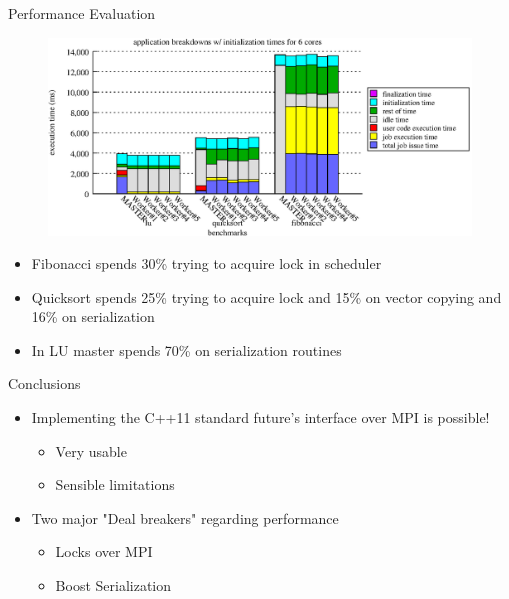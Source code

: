 \documentclass[svgnames]{beamer}
\begin{document}
\begin{frame}{Performance Evaluation}
\begin{figure}
\center
\includegraphics[width=.8\textwidth]{images/app_breakdowns_w_init}
\end{figure}
\begin{itemize}
	\item Fibonacci spends 30\% trying to acquire lock in scheduler 
	\item Quicksort spends 25\% trying to acquire lock and 15\% on vector copying and 16\% on serialization
	\item In LU master spends 70\% on serialization routines
\end{itemize}
\end{frame}
\begin{frame}{Conclusions}
\begin{itemize}
	\item Implementing the C++11 standard future's interface over MPI is possible!
	\begin{itemize}
		\item Very usable
		\item Sensible limitations
	\end{itemize}
\vfill
	\item Two major "Deal breakers" regarding performance
	\begin{itemize}
		\item Locks over MPI
		\item Boost Serialization
	\end{itemize}
\end{itemize}
\end{frame}
\end{document}
